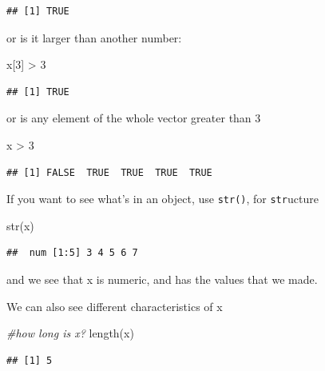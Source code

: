 \documentclass[
]{book}
\newenvironment{Shaded}{\begin{snugshade}}{\end{snugshade}}
\newcommand{\CommentTok}[1]{\textcolor[rgb]{0.56,0.35,0.01}{\textit{#1}}}
\newcommand{\DecValTok}[1]{\textcolor[rgb]{0.00,0.00,0.81}{#1}}
\newcommand{\FunctionTok}[1]{\textcolor[rgb]{0.00,0.00,0.00}{#1}}
\newcommand{\NormalTok}[1]{#1}
\newcommand{\SpecialCharTok}[1]{\textcolor[rgb]{0.00,0.00,0.00}{#1}}
\begin{document}
\begin{verbatim}
## [1] TRUE
\end{verbatim}

or is it larger than another number:

\begin{Shaded}
\begin{Highlighting}[]
\NormalTok{x[}\DecValTok{3}\NormalTok{] }\SpecialCharTok{\textgreater{}} \DecValTok{3}
\end{Highlighting}
\end{Shaded}

\begin{verbatim}
## [1] TRUE
\end{verbatim}

or is any element of the whole vector greater than 3

\begin{Shaded}
\begin{Highlighting}[]
\NormalTok{x }\SpecialCharTok{\textgreater{}} \DecValTok{3}
\end{Highlighting}
\end{Shaded}

\begin{verbatim}
## [1] FALSE  TRUE  TRUE  TRUE  TRUE
\end{verbatim}

If you want to see what's in an object, use \texttt{str()}, for \texttt{str}ucture

\begin{Shaded}
\begin{Highlighting}[]
\FunctionTok{str}\NormalTok{(x)}
\end{Highlighting}
\end{Shaded}

\begin{verbatim}
##  num [1:5] 3 4 5 6 7
\end{verbatim}

and we see that x is numeric, and has the values that we made.

We can also see different characteristics of x

\begin{Shaded}
\begin{Highlighting}[]
\CommentTok{\#how long is x?}
\FunctionTok{length}\NormalTok{(x)}
\end{Highlighting}
\end{Shaded}

\begin{verbatim}
## [1] 5
\end{verbatim}
\end{document}
